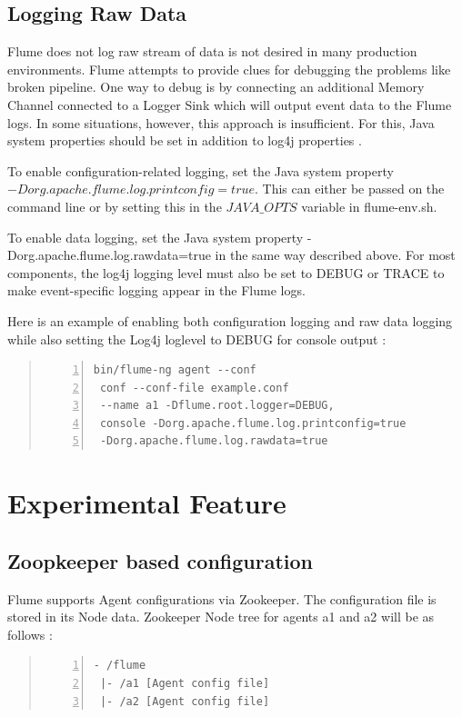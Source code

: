 \documentclass[9pt,twocolumn,twoside]{../../styles/osajnl}
\begin{document}
\subsection{Logging Raw Data}
Flume does not log raw stream of data is not desired in many production environments. Flume attempts to provide clues for debugging the problems like broken pipeline. One way to debug is by connecting an additional Memory Channel connected to a Logger Sink which will output event data to the Flume logs. In some situations, however, this approach is insufficient. For this, Java system properties should be set in addition to log4j properties \cite{user-manual}.

To enable configuration-related logging, set the Java system property $-Dorg.apache.flume.log.printconfig=true$. This can either be passed on the command line or by setting this in the $JAVA\_OPTS$ variable in flume-env.sh.

To enable data logging, set the Java system property -Dorg.apache.flume.log.rawdata=true in the same way described above. For most components, the log4j logging level must also be set to DEBUG or TRACE to make event-specific logging appear in the Flume logs.

Here is an example of enabling both configuration logging and raw data logging while also setting the Log4j loglevel to DEBUG for console output \cite{user-manual}:
\begin{quote}
\begin{Verbatim}[numbers=left]
 bin/flume-ng agent --conf 
 conf --conf-file example.conf 
 --name a1 -Dflume.root.logger=DEBUG,
 console -Dorg.apache.flume.log.printconfig=true 
 -Dorg.apache.flume.log.rawdata=true
\end{Verbatim}
\end{quote}
\section{Experimental Feature}
\subsection{Zoopkeeper based configuration}
Flume supports Agent configurations via Zookeeper. The configuration file is stored in its Node data.  Zookeeper Node tree for agents a1 and a2 will be as follows \cite{user-manual}:
\begin{quote}
\begin{Verbatim}[numbers=left]
- /flume
 |- /a1 [Agent config file]
 |- /a2 [Agent config file]
\end{Verbatim}
\end{quote}
\end{document}

